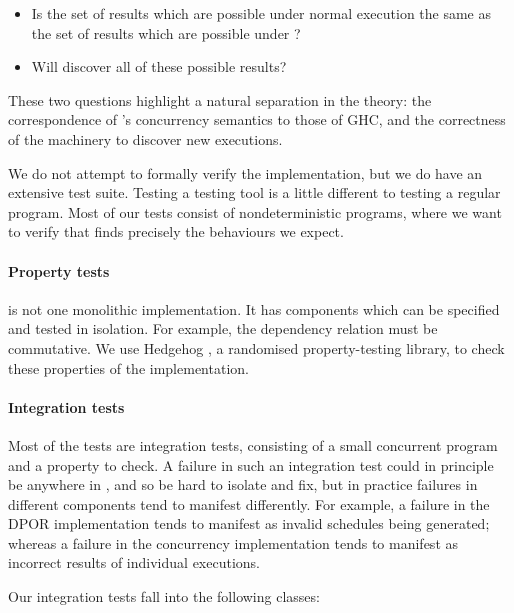 \begin{itemize}
\item Is the set of results which are possible under normal execution
  the same as the set of results which are possible under \dejafu{}?
\item Will \dejafu{} discover all of these possible results?
\end{itemize}

These two questions highlight a natural separation in the theory: the
correspondence of \dejafu{}'s concurrency semantics to those of GHC,
and the correctness of the machinery to discover new executions.

We do not attempt to formally verify the \dejafu{} implementation, but
we do have an extensive test suite.  Testing a testing tool is a
little different to testing a regular program.  Most of our tests
consist of nondeterministic programs, where we want to verify that
\dejafu{} finds precisely the behaviours we expect.

\paragraph{Property tests}
\dejafu{} is not one monolithic implementation.  It has components
which can be specified and tested in isolation.  For example, the
dependency relation must be commutative.  We use
Hedgehog \parencite{hedgehog}, a randomised property-testing library, to
check these properties of the implementation.

\paragraph{Integration tests}
Most of the tests are integration tests, consisting of a small
concurrent program and a property to check.  A failure in such an
integration test could in principle be anywhere in \dejafu{}, and so
be hard to isolate and fix, but in practice failures in different
components tend to manifest differently.  For example, a failure in
the DPOR implementation tends to manifest as invalid schedules being
generated; whereas a failure in the concurrency implementation tends
to manifest as incorrect results of individual executions.

Our integration tests fall into the following classes:

